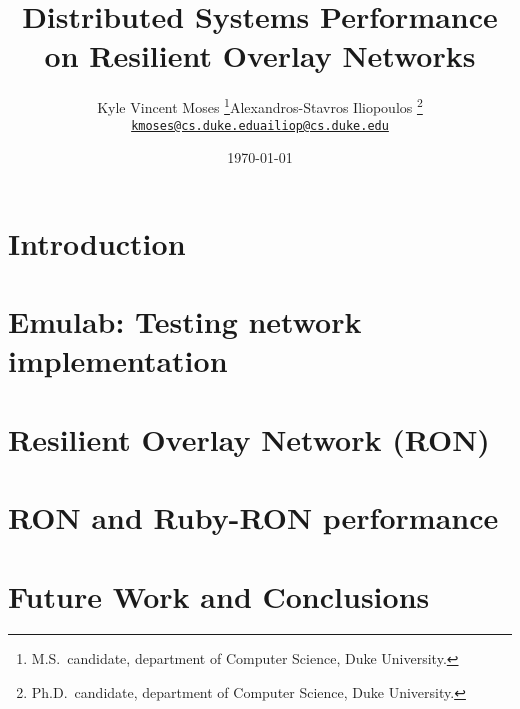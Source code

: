\documentclass[twopage,11pt]{article}
\title{Distributed Systems Performance on Resilient Overlay Networks}
\author{%
  \begin{tabular}{c @{\qquad} c}
    Kyle Vincent Moses%
    \thanks{M.S.\ candidate, department of Computer Science, Duke University.}
    & Alexandros-Stavros Iliopoulos%
    \thanks{Ph.D.\ candidate, department of Computer Science, Duke
      University.}\\
    \href{mailto:kmoses@cs.duke.edu}{\texttt{kmoses@cs.duke.edu}}
    & \href{mailto:ailiop@cs.duke.edu}{\texttt{ailiop@cs.duke.edu}}
  \end{tabular}}
\date{\today}
\numberwithin{equation}{section}
\numberwithin{figure}{section}
\numberwithin{table}{section}
\numberwithin{prog}{section}
\begin{document}
\maketitle
\onehalfspacing

\label{sec:abstract}
{}
\begin{abstract}
  
\end{abstract}


\section{Introduction}
\label{sec:intro}




\section{Emulab: Testing network implementation}
\label{sec:network}




\section{Resilient Overlay Network (RON)}
\label{sec:ron}




\section{RON and Ruby-RON performance}
\label{sec:performance}




\section{Future Work and Conclusions}
\label{sec:conclusions}









\end{document}
